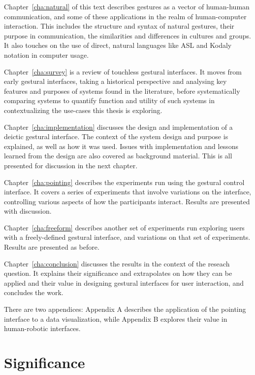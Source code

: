 \begin{todoenv}
Chapter~\ref{cha:natural} of this text describes gestures as a vector of human-human communication, and some of these applications in the realm of human-computer interaction. This includes the structure and syntax of natural gestures, their purpose in communication, the similarities and differences in cultures and groups. It also touches on the use of direct, natural languages like ASL and Kodaly notation in computer usage.

Chapter~\ref{cha:survey} is a review of touchless gestural interfaces. It moves from early gestural interfaces, taking a historical perspective and analysing key features and purposes of systems found in the literature, before systematically comparing systems to quantify function and utility of such systems in contextualizing the use-cases this thesis is exploring.

Chapter~\ref{cha:implementation} discusses the design and implementation of a deictic gestural interface. The context of the system design and purpose is explained, as well as how it was used. Issues with implementation and lessons learned from the design are also covered as background material. This is all presented for discussion in the next chapter.

Chapter~\ref{cha:pointing} describes the experiments run using the gestural control interface. It covers a series of experiments that involve variations on the interface, controlling various aspects of how the participants interact. Results are presented with discussion.

Chapter~\ref{cha:freeform} describes another set of experiments run exploring users with a freely-defined gestural interface, and variations on that set of experiments. Results are presented as before.

Chapter~\ref{cha:conclusion} discusses the results in the context of the reseach question. It explains their significance and extrapolates on how they can be applied and their value in designing gestural interfaces for user interaction, and concludes the work.

There are two appendices: Appendix A describes the application of the pointing interface to a data visualization, while Appendix B explores their value in human-robotic interfaces.
\end{todoenv}


\section{Significance}
\label{sec:significance}

